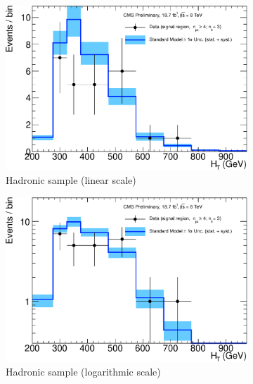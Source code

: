 \clearpage
\begin{figure}[h!]
  \centering
  \begin{subfigure}[b]{0.48\textwidth}
    \includegraphics[width=\textwidth]
    {Figs/results/v0/blueBand/single_plots/hadronic_3b_ge4j.pdf}
    \caption{Hadronic sample (linear scale)}
  \end{subfigure}
  \vspace{0.7cm}\begin{subfigure}[b]{0.48\textwidth}
    \includegraphics[width=\textwidth]
    {Figs/results/v0/blueBand/single_plots/hadronic_3b_ge4j_logy.pdf}
    \caption{Hadronic sample (logarithmic scale)}
  \end{subfigure}
  \begin{subfigure}[b]{0.48\textwidth}

\end{subfigure}
\end{figure}
